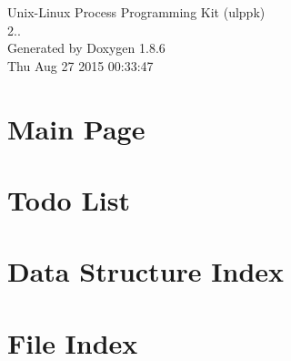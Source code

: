 \documentclass[twoside]{book}
\newcommand{\clearemptydoublepage}{%
  \newpage{\pagestyle{empty}\cleardoublepage}%
}
\begin{document}
\hypersetup{pageanchor=false}
\begin{titlepage}
\vspace*{7cm}
\begin{center}%
{\Large Unix-\/\-Linux Process Programming Kit (ulppk) \\[1ex]\large 2.. }\\
\vspace*{1cm}
{\large Generated by Doxygen 1.8.6}\\
\vspace*{0.5cm}
{\small Thu Aug 27 2015 00:33:47}\\
\end{center}
\end{titlepage}
\clearemptydoublepage
\tableofcontents
\clearemptydoublepage
{}
\hypersetup{pageanchor=true}

\chapter{Main Page}
\label{index}\hypertarget{index}{}
\chapter{Todo List}
\label{todo}
\hypertarget{todo}{}

\chapter{Data Structure Index}

\chapter{File Index}

\end{document}
